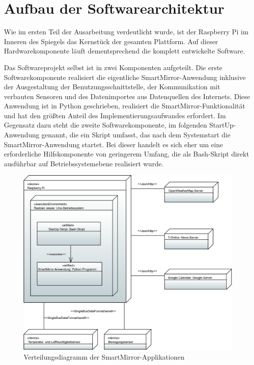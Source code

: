 \section{Aufbau der Softwarearchitektur}
Wie im ersten Teil der Ausarbeitung verdeutlicht wurde, ist der Raspberry Pi im Inneren des Spiegels das Kernstück der gesamten Plattform. Auf dieser Hardwarekomponente läuft dementsprechend die komplett entwickelte Software. 

Das Softwareprojekt selbst ist in zwei Komponenten aufgeteilt. Die erste Softwarekomponente realisiert die eigentliche SmartMirror-Anwendung inklusive der Ausgestaltung der Benutzungsschnittstelle, der Kommunikation mit verbauten Sensoren und des Datenimportes aus Datenquellen des Internets. Diese Anwendung ist in Python geschrieben, realisiert die SmartMirror-Funktionalität und hat den größten Anteil des Implementierungsaufwandes erfordert. Im Gegensatz dazu steht die zweite Softwarekomponente, im folgenden StartUp-Anwendung genannt, die ein Skript umfasst, das nach dem Systemstart die SmartMirror-Anwendung startet. Bei dieser handelt es sich eher um eine erforderliche Hilfskomponente von geringerem Umfang, die als Bash-Skript direkt ausführbar auf Betriebssystemebene realisiert wurde.  

\begin{figure}
	\centering
	\def\svgwidth{0.7\linewidth}
	\includegraphics[width=0.7\linewidth]{bilder/DeploymentDiagram}
	\caption[Verteilungsdiagramm der SmartMirror-Applikationen]{Verteilungsdiagramm der SmartMirror-Applikationen}
	\label{fig:verteilungsdiagramm}
\end{figure}

